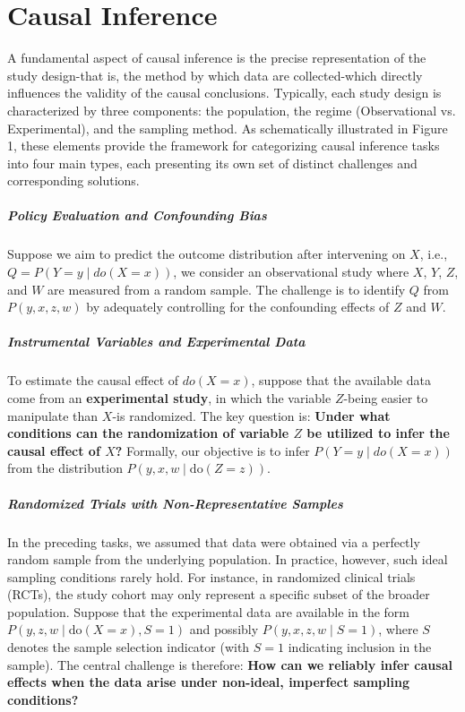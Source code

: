 \chapter{Causal Inference}\label{chap:causal-inference}

A fundamental aspect of causal inference is the precise representation of the study design-that is, the method by which data are collected-which directly influences the validity of the causal conclusions. Typically, each study design is characterized by three components: the population, the regime (Observational vs. Experimental), and the sampling method. As schematically illustrated in Figure 1, these elements provide the framework for categorizing causal inference tasks into four main types, each presenting its own set of distinct challenges and corresponding solutions.

\paragraph{Policy Evaluation and Confounding Bias}

Suppose we aim to predict the outcome distribution after intervening on \(X\), i.e.,  \(Q=P(Y=y\mid do(X=x))\), we consider an observational study where \(X\), \(Y\), \(Z\), and \(W\) are measured from a random sample. The challenge is to identify \(Q\) from  \(P(y,x,z,w)\) by adequately controlling for the confounding effects of \(Z\) and \(W\).

\paragraph{Instrumental Variables and Experimental Data}

To estimate the causal effect of \(do(X = x)\), suppose that the available data come from an \textbf{experimental study}, in which the variable \(Z\)-being easier to manipulate than \(X\)-is randomized. The key question is: \textbf{Under what conditions can the randomization of variable \(Z\) be utilized to infer the causal effect of \(X\)?} Formally, our objective is to infer  \(P(Y = y \mid do(X = x))\) from the distribution \(P(y, x, w \mid \text{do}(Z = z))\).

\paragraph{Randomized Trials with Non-Representative Samples}

In the preceding tasks, we assumed that data were obtained via a perfectly random sample from the underlying population. In practice, however, such ideal sampling conditions rarely hold. For instance, in randomized clinical trials (RCTs), the study cohort may only represent a specific subset of the broader population. Suppose that the experimental data are available in the form \(P(y,z,w\mid \text{do}(X=x), S=1)\) and possibly \(P(y,x,z,w\mid S=1)\), where \(S\) denotes the sample selection indicator (with \(S=1\) indicating inclusion in the sample). The central challenge is therefore: \textbf{How can we reliably infer causal effects when the data arise under non-ideal, imperfect sampling conditions?}


